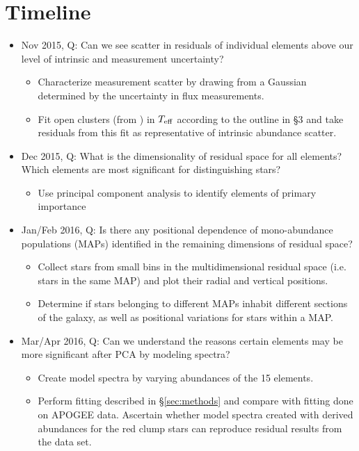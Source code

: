 \documentclass[preprint]{aastex}
\begin{document}
\section{Timeline}
\label{sec:timeline}

\begin{itemize}
\item Nov 2015, Q: Can we see scatter in residuals of individual elements above our level of intrinsic and measurement uncertainty?
\begin{itemize}
\item Characterize measurement scatter by drawing from a Gaussian determined by the uncertainty in flux measurements.
\item Fit open clusters (from \citet{meszaros2015}) in $T_{\rm eff}$ according to the outline in \S3 and take residuals from this fit as representative of intrinsic abundance scatter.
\end{itemize}
\item Dec 2015, Q: What is the dimensionality of residual space for all elements? Which elements are most significant for distinguishing stars?
\begin{itemize}
\item Use principal component analysis to identify elements of primary importance
\end{itemize}
\item Jan/Feb 2016, Q: Is there any positional dependence of mono-abundance populations (MAPs) identified in the remaining dimensions of residual space?
\begin{itemize}
\item Collect stars from small bins in the multidimensional residual space (i.e. stars in the same MAP) and plot their radial and vertical positions.
\item Determine if stars belonging to different MAPs inhabit different sections of the galaxy, as well as positional variations for stars within a MAP.
\end{itemize}
\item Mar/Apr 2016, Q: Can we understand the reasons certain elements may be more significant after PCA by modeling spectra?
\begin{itemize}
\item Create model spectra by varying abundances of the 15 elements.
\item Perform fitting described in \S\ref{sec:methods} and compare with fitting done on APOGEE data. Ascertain whether model spectra created with derived abundances for the red clump stars can reproduce residual results from the data set.
\end{itemize}
\end{itemize}
\end{document}
